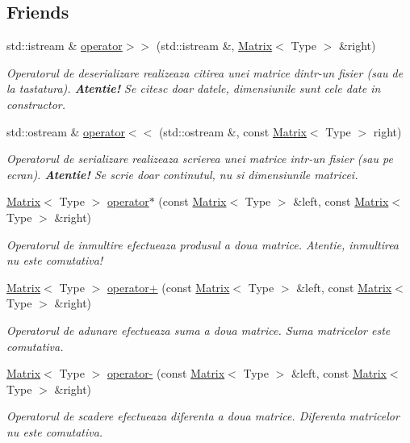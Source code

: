 \subsection*{Friends}
\begin{DoxyCompactItemize}
\item 
std::istream \& \hyperlink{classMatrix_a7e819908cb4e8e09980fd9381634d48f}{operator$>$$>$} (std::istream \&, \hyperlink{classMatrix}{Matrix}$<$ Type $>$ \&right)
\begin{DoxyCompactList}\small\item\em Operatorul de deserializare realizeaza citirea unei matrice dintr-\/un fisier (sau de la tastatura). {\bfseries  Atentie!} Se citesc doar datele, dimensiunile sunt cele date in constructor. \item\end{DoxyCompactList}\item 
std::ostream \& \hyperlink{classMatrix_a8f189cca48033f65cb272270343c2552}{operator$<$$<$} (std::ostream \&, const \hyperlink{classMatrix}{Matrix}$<$ Type $>$ right)
\begin{DoxyCompactList}\small\item\em Operatorul de serializare realizeaza scrierea unei matrice intr-\/un fisier (sau pe ecran). {\bfseries  Atentie!} Se scrie doar continutul, nu si dimensiunile matricei. \item\end{DoxyCompactList}\item 
\hyperlink{classMatrix}{Matrix}$<$ Type $>$ \hyperlink{classMatrix_a2010b1cbd96555d2031fe00cc3686c40}{operator$\ast$} (const \hyperlink{classMatrix}{Matrix}$<$ Type $>$ \&left, const \hyperlink{classMatrix}{Matrix}$<$ Type $>$ \&right)
\begin{DoxyCompactList}\small\item\em Operatorul de inmultire efectueaza produsul a doua matrice. Atentie, inmultirea nu este comutativa! \item\end{DoxyCompactList}\item 
\hyperlink{classMatrix}{Matrix}$<$ Type $>$ \hyperlink{classMatrix_a94ca96fc24df6e145ed15ee99447c188}{operator+} (const \hyperlink{classMatrix}{Matrix}$<$ Type $>$ \&left, const \hyperlink{classMatrix}{Matrix}$<$ Type $>$ \&right)
\begin{DoxyCompactList}\small\item\em Operatorul de adunare efectueaza suma a doua matrice. Suma matricelor este comutativa. \item\end{DoxyCompactList}\item 
\hyperlink{classMatrix}{Matrix}$<$ Type $>$ \hyperlink{classMatrix_ac80472ae19b5bc1f5390b34229c9efef}{operator-\/} (const \hyperlink{classMatrix}{Matrix}$<$ Type $>$ \&left, const \hyperlink{classMatrix}{Matrix}$<$ Type $>$ \&right)
\begin{DoxyCompactList}\small\item\em Operatorul de scadere efectueaza diferenta a doua matrice. Diferenta matricelor nu este comutativa. \item\end{DoxyCompactList}\end{DoxyCompactItemize}
